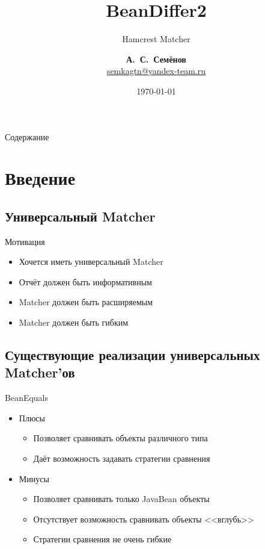\documentclass{beamer}
\title{BeanDiffer2}
\subtitle{Hamcrest Matcher}
\author{\textbf{А.~С.~Семёнов} \\ \href{mailto:semkagtn@yandex-team.ru}{semkagtn@yandex-team.ru}}
\institute{\textbf{\textcolor{red}{Я}ндекс}}
\date{\today}
\begin{document}
\begin{frame}
  \titlepage
\end{frame}

\begin{frame}{Содержание}
  \tableofcontents
\end{frame}

\section{Введение}

\subsection{Универсальный Matcher}

\begin{frame}{Мотивация}
  \pause
  \begin{itemize}
      \item {Хочется иметь универсальный Matcher \pause}
      \item {Отчёт должен быть информативным \pause}
      \item {Matcher должен быть расширяемым \pause}
      \item {Matcher должен быть гибким}
  \end{itemize}
\end{frame}

\subsection{Существующие реализации универсальных Matcher'ов}

\begin{frame}{BeanEquals}
  \pause
  \begin{itemize}
    \item Плюсы
        \pause
        \begin{itemize}
            \item {Позволяет сравнивать объекты различного типа \pause}
            \item {Даёт возможность задавать стратегии сравнения}
        \end{itemize}
        \pause
    \item Минусы
        \pause
        \begin{itemize}
          \item {Позволяет сравнивать только JavaBean объекты \pause}
          \item {Отсутствует возможность сравнивать объекты <<вглубь>> \pause}
          \item {Стратегии сравнения не очень гибкие}
        \end{itemize}
  \end{itemize}
\end{frame}
\end{document}
